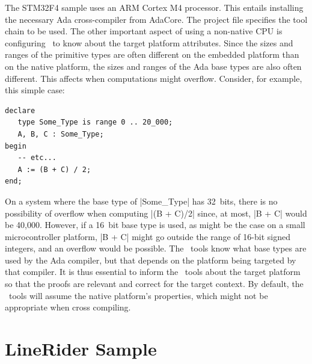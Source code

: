 The STM32F4 sample uses an ARM Cortex M4 processor. This entails installing the necessary Ada
cross-compiler from AdaCore. The project file specifies the tool chain to be used. The other
important aspect of using a non-native CPU is configuring \SPARK\ to know about the target
platform attributes. Since the sizes and ranges of the primitive types are often different on
the embedded platform than on the native platform, the sizes and ranges of the Ada base types
are also often different. This affects when computations might overflow. Consider, for example,
this simple case:

\begin{lstlisting}
declare
   type Some_Type is range 0 .. 20_000;
   A, B, C : Some_Type;
begin
   -- etc...
   A := (B + C) / 2;
end;
\end{lstlisting}

On a system where the base type of |Some_Type| has 32~bits, there is no possibility of overflow
when computing |(B + C)/2| since, at most, |B + C| would be 40,000. However, if a 16~bit base
type is used, as might be the case on a small microcontroller platform, |B + C| might go outside
the range of 16-bit signed integers, and an overflow would be possible. The \SPARK\ tools know
what base types are used by the Ada compiler, but that depends on the platform being targeted
by that compiler. It is thus essential to inform the \SPARK\ tools about the target platform so
that the proofs are relevant and correct for the target context. By default, the \SPARK\ tools
will assume the native platform's properties, which might not be appropriate when cross
compiling.


\section{LineRider Sample}
\label{sec:linerider-sample}

